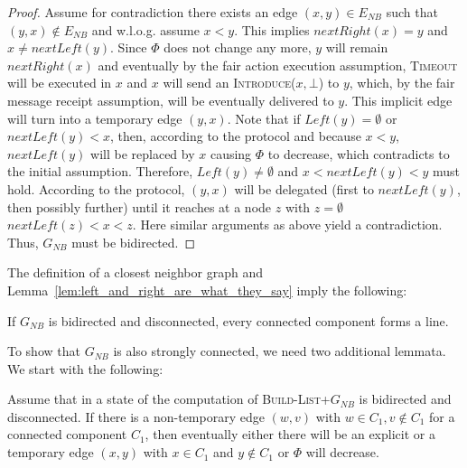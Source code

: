 \documentclass[a4paper,USenglish]{lipics}
\newcommand{\blp}{\textsc{Build-List+}\xspace}
\newcommand{\introduce}[1]{\textsc{Introduce(\ensuremath{#1})}\xspace}
\newcommand{\timeout}{\textsc{Timeout}\xspace}
\begin{document}
\begin{proof}
 Assume for contradiction there exists an edge $(x,y) \in E_{NB}$ such that $(y,x) \notin E_{NB}$ and w.l.o.g. assume $x < y$.
 This implies $nextRight(x)=y$ and $x\neq nextLeft(y)$.
 Since $\Phi$ does not change any more, $y$ will remain $nextRight(x)$ and eventually by the fair action execution assumption, \timeout will be executed in $x$ and $x$ will send an \introduce{x,\bot} to $y$, which, by the fair message receipt assumption, will be eventually delivered to $y$.
 This implicit edge will turn into a temporary edge $(y,x)$.
 Note that if $Left(y) = \emptyset$ or $nextLeft(y) < x$, then, according to the protocol and because $x < y$, $nextLeft(y)$ will be replaced by $x$ causing $\Phi$ to decrease, which contradicts to the initial assumption.
 Therefore, $Left(y) \neq \emptyset$ and $x < nextLeft(y) < y$ must hold.
 According to the protocol, $(y,x)$ will be delegated (first to $nextLeft(y)$, then possibly further) until it reaches at a node $z$ with $z = \emptyset$ $nextLeft(z) < x < z$.
 Here similar arguments as above yield a contradiction. 
 Thus, $G_{NB}$ must be bidirected.
\end{proof}
The definition of a closest neighbor graph and Lemma~\ref{lem:left_and_right_are_what_they_say} imply the following:
\begin{corollary}\label{cor:only_topology_is_line}
 If $G_{NB}$ is bidirected and disconnected, every connected component forms a line.
\end{corollary}
To show that $G_{NB}$ is also strongly connected, we need two additional lemmata.
We start with the following:
 \begin{lemma}\label{lem:non_temporary_will_become_expl_or_temporary}
  Assume that in a state of the computation of \blp $G_{NB}$ is bidirected and disconnected.
  If there is a non-temporary edge $(w,v)$ with $w \in C_1, v \notin C_1$ for a connected component $C_1$, then eventually either there will be an explicit or a temporary edge $(x,y)$ with $x \in C_1$ and $y \notin C_1$ or $\Phi$ will decrease.
 \end{lemma}
 
\end{document}
